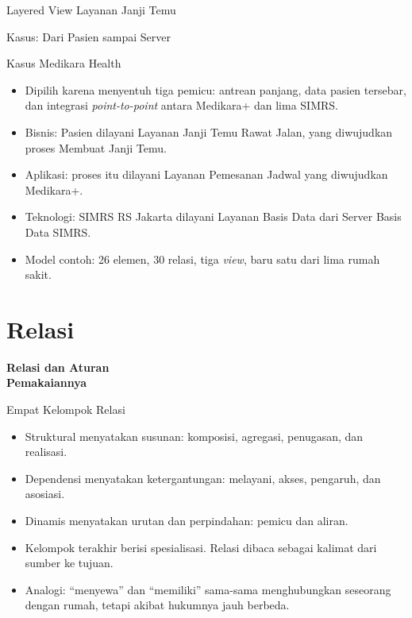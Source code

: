 \documentclass[aspectratio=169, table, 12pt]{beamer}
\begin{document}
\begin{frame}{{\Large Layered View Layanan Janji Temu}}
  \centering
\end{frame}

\begin{frame}{{\Large Kasus: Dari Pasien sampai Server}}
  \begin{block}{Kasus Medikara Health}
    \small
    \begin{itemize}
      \item Dipilih karena menyentuh tiga pemicu: antrean panjang, data pasien tersebar, dan integrasi
            \textit{point-to-point} antara Medikara+ dan lima SIMRS.
      \item Bisnis: Pasien dilayani Layanan Janji Temu Rawat Jalan, yang diwujudkan proses Membuat Janji
            Temu.
      \item Aplikasi: proses itu dilayani Layanan Pemesanan Jadwal yang diwujudkan Medikara+.
      \item Teknologi: SIMRS RS Jakarta dilayani Layanan Basis Data dari Server Basis Data SIMRS.
      \item Model contoh: 26 elemen, 30 relasi, tiga \textit{view}, baru satu dari lima rumah sakit.
    \end{itemize}
  \end{block}
\end{frame}

\section{Relasi}

\begin{frame}{\hfill}
  \centering
  \Huge{\textbf{Relasi dan Aturan\\Pemakaiannya}}
\end{frame}

\begin{frame}{{\Large Empat Kelompok Relasi}}
  \vspace{6pt}
  \small
  \begin{itemize}
    \item Struktural menyatakan susunan: komposisi, agregasi, penugasan, dan realisasi.
    \item Dependensi menyatakan ketergantungan: melayani, akses, pengaruh, dan asosiasi.
    \item Dinamis menyatakan urutan dan perpindahan: pemicu dan aliran.
    \item Kelompok terakhir berisi spesialisasi. Relasi dibaca sebagai kalimat dari sumber ke tujuan.
    \item Analogi: ``menyewa'' dan ``memiliki'' sama-sama menghubungkan seseorang dengan rumah, tetapi
          akibat hukumnya jauh berbeda.
  \end{itemize}
\end{frame}
\end{document}
